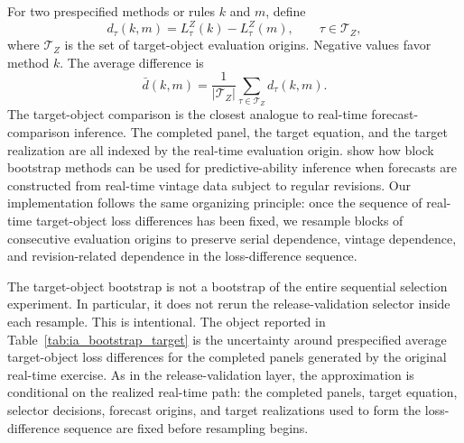 \documentclass[a4paper,12pt]{article}
\newcommand{\Tcal}{\mathcal{T}}
\newcommand{\1}{\mathbf{1}}
\begin{document}
For two prespecified methods or rules $k$ and $m$, define
\[
    d_\tau(k,m)=L^Z_\tau(k)-L^Z_\tau(m),\qquad \tau\in\Tcal_Z,
\]
where $\Tcal_Z$ is the set of target-object evaluation origins. Negative values favor method $k$. The average difference is
\[
    \bar d(k,m)=\frac{1}{|\Tcal_Z|}\sum_{\tau\in\Tcal_Z}d_\tau(k,m).
\]
The target-object comparison is the closest analogue to real-time forecast-comparison inference. The completed panel, the target equation, and the target realization are all indexed by the real-time evaluation origin. \citet{GoncalvesMcCrackenYao2025} show how block bootstrap methods can be used for predictive-ability inference when forecasts are constructed from real-time vintage data subject to regular revisions. Our implementation follows the same organizing principle: once the sequence of real-time target-object loss differences has been fixed, we resample blocks of consecutive evaluation origins to preserve serial dependence, vintage dependence, and revision-related dependence in the loss-difference sequence.

The target-object bootstrap is not a bootstrap of the entire sequential selection experiment. In particular, it does not rerun the release-validation selector inside each resample. This is intentional. The object reported in Table~\ref{tab:ia_bootstrap_target} is the uncertainty around prespecified average target-object loss differences for the completed panels generated by the original real-time exercise. As in the release-validation layer, the approximation is conditional on the realized real-time path: the completed panels, target equation, selector decisions, forecast origins, and target realizations used to form the loss-difference sequence are fixed before resampling begins.
\end{document}
